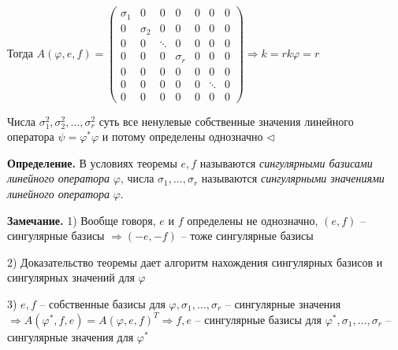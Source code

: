Тогда $A(\varphi, e, f) = \begin{pmatrix} \sigma_1 & 0 & 0 & 0 & 0 & 0 & 0 \\  0 & \sigma_2 & 0 & 0 & 0 & 0 & 0 \\ 0 & 0 & \ddots & 0 & 0 & 0 & 0 \\ 0 & 0 & 0 & \sigma_r & 0 & 0 & 0 \\ 0 & 0 & 0 & 0 & 0 & 0 & 0 \\ 0 & 0 & 0 & 0 & 0 & \ddots & 0 \\ 0 & 0 & 0 & 0 & 0 & 0 & 0  \end{pmatrix} \Rightarrow k = rk \varphi = r$

\vspace{\baselineskip}
Числа $\sigma_1^2, \sigma_2^2, \dots, \sigma_r^2$ суть все ненулевые собственные значения линейного оператора $\psi = \varphi^* \varphi$ и потому определены однозначно $\lhd$

\vspace{\baselineskip}
\textbf{Определение.} В условиях теоремы $e, f$ называются \textit{сингулярными базисами линейного оператора} $\varphi$, числа $\sigma_1, \dots, \sigma_r$ называются \textit{сингулярными значениями линейного оператора} $\varphi$.

\vspace{\baselineskip}
\textbf{Замечание.} 1) Вообще говоря, $e$ и $f$ определены не однозначно, $(e, f)$ -- сингулярные базисы $\Rightarrow (-e, -f)$ -- тоже сингулярные базисы

2) Доказательство теоремы дает алгоритм нахождения сингулярных базисов и сингулярных значений для $\varphi$

3) $e, f$ -- собственные базисы для $\varphi, \sigma_1, \dots, \sigma_r$ -- сингулярные значения $\Rightarrow A(\varphi^*, f, e) = A(\varphi, e, f)^T \Rightarrow f, e$ -- сингулярные базисы для $\varphi^*, \sigma_1, \dots, \sigma_r$ -- сингулярные значения для $\varphi^*$

